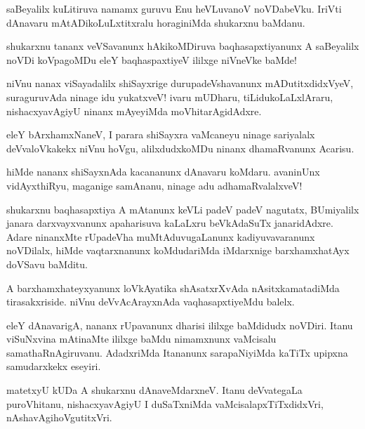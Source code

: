\documentclass{article}
\begin{document}
\begin{mn}
saBeyalilx kuLitiruva namamx guruvu Enu heVLuvanoV noVDabeVku. IriVti
dAnavaru mAtADikoLuLxtitxralu horaginiMda shukarxnu baMdanu.
\end{mn}

\begin{mn}
shukarxnu tananx veVSavanunx hAkikoMDiruva baqhasapxtiyanunx A
saBeyalilx noVDi koVpagoMDu eleY baqhaspaxtiyeV ililxge niVneVke baMde!
\end{mn}

\begin{mn}%
niVnu nanax viSayadalilx shiSayxrige durupadeVshavanunx
mADutitxdidxVyeV, suraguruvAda ninage idu yukatxveV! ivaru mUDharu,
tiLidukoLaLxlAraru, nishacxyavAgiyU ninanx mAyeyiMda moVhitarAgidAdxre.
\end{mn}

\begin{mn}
eleY bArxhamxNaneV, I parara shiSayxra vaMcaneyu ninage sariyalalx
deVvaloVkakekx niVnu hoVgu, alilxdudxkoMDu ninanx dhamaRvanunx Acarisu.
\end{mn}

\begin{mn}
hiMde nananx shiSayxnAda kacananunx dAnavaru koMdaru. avaninUnx
vidAyxthiRyu, maganige samAnanu, ninage adu adhamaRvalalxveV!
\end{mn}

\begin{mn}%
shukarxnu baqhasapxtiya A mAtanunx keVLi padeV padeV nagutatx,
BUmiyalilx janara darxvayxvanunx apaharisuva kaLaLxru beVkAdaSuTx
janaridAdxre. Adare ninanxMte rUpadeVha muMtAduvugaLanunx
kadiyuvavaranunx noVDilalx, hiMde vaqtarxnanunx koMdudariMda
iMdarxnige barxhamxhatAyx doVSavu baMditu.
\end{mn}

\begin{mn}%
A barxhamxhateyxyanunx loVkAyatika shAsatxrXvAda nAsitxkamatadiMda
tirasakxriside. niVnu deVvAcArayxnAda vaqhasapxtiyeMdu balelx.
\end{mn}

\begin{mn}
eleY dAnavarigA, nananx rUpavanunx dharisi ililxge baMdidudx
noVDiri. Itanu viSuNxvina mAtinaMte ililxge baMdu nimamxnunx vaMcisalu
samathaRnAgiruvanu. AdadxriMda Itananunx sarapaNiyiMda kaTiTx upipxna
samudarxkekx eseyiri.
\end{mn}

\begin{mn}
matetxyU kUDa A shukarxnu dAnaveMdarxneV. Itanu deVvategaLa
puroVhitanu, nishacxyavAgiyU I duSaTxniMda vaMcisalapxTiTxdidxVri, nAshavAgihoVgutitxVri.
\end{mn}
\end{document}
